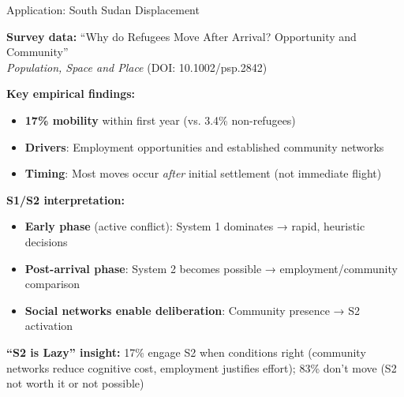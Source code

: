 \documentclass[aspectratio=169]{beamer}
\begin{document}
\begin{frame}{Application: South Sudan Displacement}

\textbf{Survey data:} ``Why do Refugees Move After Arrival? Opportunity and Community''\\
\textit{Population, Space and Place} (DOI: 10.1002/psp.2842)

\vspace{0.5em}

\textbf{Key empirical findings:}
\begin{itemize}
    \item \textbf{17\% mobility} within first year (vs. 3.4\% non-refugees)
    \item \textbf{Drivers}: Employment opportunities and established community networks
    \item \textbf{Timing}: Most moves occur \textit{after} initial settlement (not immediate flight)
\end{itemize}

\vspace{0.5em}

\textbf{S1/S2 interpretation:}
\begin{itemize}
    \item \textbf{Early phase} (active conflict): System 1 dominates → rapid, heuristic decisions
    \item \textbf{Post-arrival phase}: System 2 becomes possible → employment/community comparison
    \item \textbf{Social networks enable deliberation}: Community presence → S2 activation
\end{itemize}

\vspace{0.5em}

\textbf{``S2 is Lazy'' insight:} 17\% engage S2 when conditions right (community networks reduce cognitive cost, employment justifies effort); 83\% don't move (S2 not worth it or not possible)

\end{frame}
\end{document}
